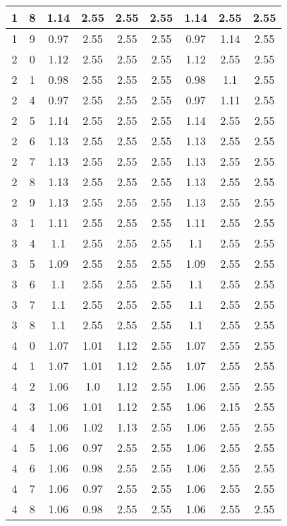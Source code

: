 \begin{longtable}{|c|c||c||c|c|c||c|c|c|}
	1 & 8 & 1.14 & 2.55 & 2.55 & 2.55 & 1.14 & 2.55 & 2.55 \\ \hline
	1 & 9 & 0.97 & 2.55 & 2.55 & 2.55 & 0.97 & 1.14 & 2.55 \\ \hline
	2 & 0 & 1.12 & 2.55 & 2.55 & 2.55 & 1.12 & 2.55 & 2.55 \\ \hline
	2 & 1 & 0.98 & 2.55 & 2.55 & 2.55 & 0.98 & 1.1 & 2.55 \\ \hline
	2 & 4 & 0.97 & 2.55 & 2.55 & 2.55 & 0.97 & 1.11 & 2.55 \\ \hline
	2 & 5 & 1.14 & 2.55 & 2.55 & 2.55 & 1.14 & 2.55 & 2.55 \\ \hline
	2 & 6 & 1.13 & 2.55 & 2.55 & 2.55 & 1.13 & 2.55 & 2.55 \\ \hline
	2 & 7 & 1.13 & 2.55 & 2.55 & 2.55 & 1.13 & 2.55 & 2.55 \\ \hline
	2 & 8 & 1.13 & 2.55 & 2.55 & 2.55 & 1.13 & 2.55 & 2.55 \\ \hline
	2 & 9 & 1.13 & 2.55 & 2.55 & 2.55 & 1.13 & 2.55 & 2.55 \\ \hline
	3 & 1 & 1.11 & 2.55 & 2.55 & 2.55 & 1.11 & 2.55 & 2.55 \\ \hline
	3 & 4 & 1.1 & 2.55 & 2.55 & 2.55 & 1.1 & 2.55 & 2.55 \\ \hline
	3 & 5 & 1.09 & 2.55 & 2.55 & 2.55 & 1.09 & 2.55 & 2.55 \\ \hline
	3 & 6 & 1.1 & 2.55 & 2.55 & 2.55 & 1.1 & 2.55 & 2.55 \\ \hline
	3 & 7 & 1.1 & 2.55 & 2.55 & 2.55 & 1.1 & 2.55 & 2.55 \\ \hline
	3 & 8 & 1.1 & 2.55 & 2.55 & 2.55 & 1.1 & 2.55 & 2.55 \\ \hline
	4 & 0 & 1.07 & 1.01 & 1.12 & 2.55 & 1.07 & 2.55 & 2.55 \\ \hline
	4 & 1 & 1.07 & 1.01 & 1.12 & 2.55 & 1.07 & 2.55 & 2.55 \\ \hline
	4 & 2 & 1.06 & 1.0 & 1.12 & 2.55 & 1.06 & 2.55 & 2.55 \\ \hline
	4 & 3 & 1.06 & 1.01 & 1.12 & 2.55 & 1.06 & 2.15 & 2.55 \\ \hline
	4 & 4 & 1.06 & 1.02 & 1.13 & 2.55 & 1.06 & 2.55 & 2.55 \\ \hline
	4 & 5 & 1.06 & 0.97 & 2.55 & 2.55 & 1.06 & 2.55 & 2.55 \\ \hline
	4 & 6 & 1.06 & 0.98 & 2.55 & 2.55 & 1.06 & 2.55 & 2.55 \\ \hline
	4 & 7 & 1.06 & 0.97 & 2.55 & 2.55 & 1.06 & 2.55 & 2.55 \\ \hline
	4 & 8 & 1.06 & 0.98 & 2.55 & 2.55 & 1.06 & 2.55 & 2.55 \\ \hline

\end{longtable}
